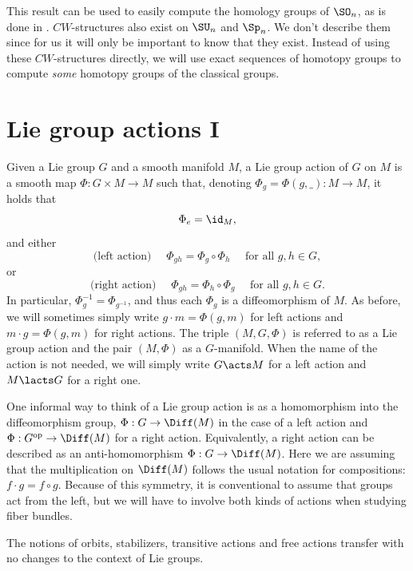This result can be used to easily compute the homology groups of $\SO_n$, as is done in \cite{Hatcher}. $CW$-structures also exist on $\SU_n$ and $\Sp_n$. We don't describe them since for us it will only be important to know that they exist. Instead of using these $CW$-structures directly, we will use exact sequences of homotopy groups to compute \emph{some} homotopy groups of the classical groups.





\section{Lie group actions I} \label{sec: Lie group actions}

\begin{defn}
    Given a Lie group $G$ and a smooth manifold $M$, a Lie group action of $G$ on $M$ is a smooth map $\Phi:G\times M\to M$ such that, denoting $\Phi_g=\Phi(g,\_):M\to M$, it holds that \[\Phi_e=\id_M,\] and either
    \[\text{(left action) }\quad \Phi_{gh}=\Phi_g\circ \Phi_h\quad \text{ for all } g,h\in G, \]
    or
    \[\text{(right action) }\quad \Phi_{gh}=\Phi_h\circ \Phi_g\quad \text{ for all } g,h\in G.\]
    In particular, $\Phi_{g}^{-1}=\Phi_{g^{-1}}$, and thus each $\Phi_g$ is a diffeomorphism of $M$. As before, we will sometimes simply write $g\cdot m=\Phi(g,m)$ for left actions and $m\cdot g=\Phi(g,m)$ for right actions. The triple $(M,G,\Phi)$ is referred to as a Lie group action and the pair $(M,\Phi)$ as a $G$-manifold. When the name of the action is not needed, we will simply write $G\acts M$ for a left action and $M\lacts G$ for a right one.
\end{defn}

\begin{rem}
    One informal way to think of a Lie group action is as a homomorphism into the diffeomorphism group, $\Phi:G\to \Diff(M)$ in the case of a left action and $\Phi:G^{\mathrm{op}}\to \Diff(M)$ for a right action. Equivalently, a right action can be described as an anti-homomorphism $\Phi:G\to \Diff(M)$. Here we are assuming that the multiplication on $\Diff(M)$ follows the usual notation for compositions: $f\cdot g=f\circ g$. Because of this symmetry, it is conventional to assume that groups act from the left, but we will have to involve both kinds of actions when studying fiber bundles.
\end{rem}

The notions of orbits, stabilizers, transitive actions and free actions transfer with no changes to the context of Lie groups.


